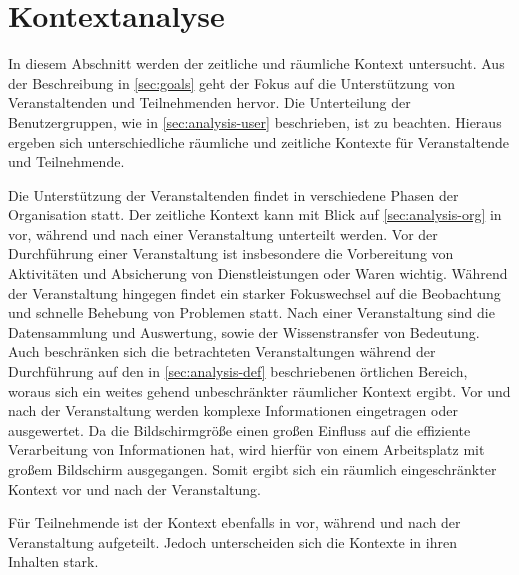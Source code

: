 

\section{Kontextanalyse} \label{sec:analysis-context}

In diesem Abschnitt werden der zeitliche und räumliche Kontext untersucht. Aus
der Beschreibung in \autoref{sec:goals} geht der Fokus auf die Unterstützung von
Veranstaltenden und Teilnehmenden hervor. Die Unterteilung der Benutzergruppen,
wie in \autoref{sec:analysis-user} beschrieben, ist zu beachten. Hieraus ergeben
sich unterschiedliche räumliche und zeitliche Kontexte für Veranstaltende und
Teilnehmende.

Die Unterstützung der Veranstaltenden findet in verschiedene Phasen der
Organisation statt. Der zeitliche Kontext kann mit Blick auf
\autoref{sec:analysis-org} in vor, während und nach einer Veranstaltung
unterteilt werden. Vor der Durchführung einer Veranstaltung ist insbesondere die
Vorbereitung von Aktivitäten und Absicherung von Dienstleistungen oder Waren
wichtig. Während der Veranstaltung hingegen findet ein starker Fokuswechsel auf
die Beobachtung und schnelle Behebung von Problemen statt. Nach einer
Veranstaltung sind die Datensammlung und Auswertung, sowie der Wissenstransfer
von Bedeutung. \\
Auch beschränken sich die betrachteten Veranstaltungen während der Durchführung
auf den in \autoref{sec:analysis-def} beschriebenen örtlichen Bereich, woraus
sich ein weites gehend unbeschränkter räumlicher Kontext ergibt. Vor und nach
der Veranstaltung werden komplexe Informationen eingetragen oder ausgewertet. Da
die Bildschirmgröße einen großen Einfluss auf die effiziente Verarbeitung von
Informationen hat, wird hierfür von einem Arbeitsplatz mit großem Bildschirm
ausgegangen. Somit ergibt sich ein räumlich eingeschränkter Kontext vor und nach
der Veranstaltung.

Für Teilnehmende ist der Kontext ebenfalls in vor, während und nach der
Veranstaltung aufgeteilt. Jedoch unterscheiden sich die Kontexte in ihren
Inhalten stark.




